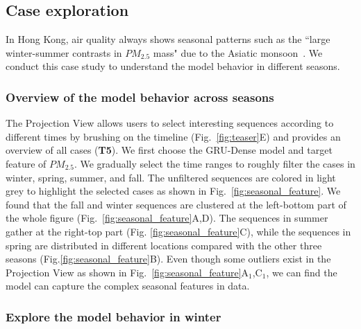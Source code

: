 \subsection{Case exploration}

In Hong Kong, air quality always shows seasonal patterns such as the ``large winter-summer contrasts in $PM_{2.5}$ mass" due to the Asiatic monsoon~\cite{louie2005seasonal}. We conduct this case study to understand the model behavior in different seasons.  

\subsubsection{Overview of the model behavior across seasons}

The Projection View allows users to select interesting sequences according to different times by brushing on the timeline (Fig.~\ref{fig:teaser}E) and provides an overview of all cases (\textbf{T5}).
We first choose the GRU-Dense model and target feature of $PM_{2.5}$.
We gradually select the time ranges to roughly filter the cases in winter, spring, summer, and fall. 
The unfiltered sequences are colored in light grey to highlight the selected cases as shown in  Fig.~\ref{fig:seasonal_feature}. 
We found that the fall and winter sequences are clustered at the left-bottom part of the whole figure (Fig.~\ref{fig:seasonal_feature}A,D). 
The sequences in summer gather at the right-top part (Fig. \ref{fig:seasonal_feature}C), while the sequences in spring are distributed in different locations compared with the other three seasons (Fig.\ref{fig:seasonal_feature}B).
Even though some outliers exist in the Projection View as shown in Fig.~\ref{fig:seasonal_feature}A$_1$,C$_1$, we can find the model can capture the complex seasonal features in data. 

\subsubsection{Explore the model behavior in winter}

